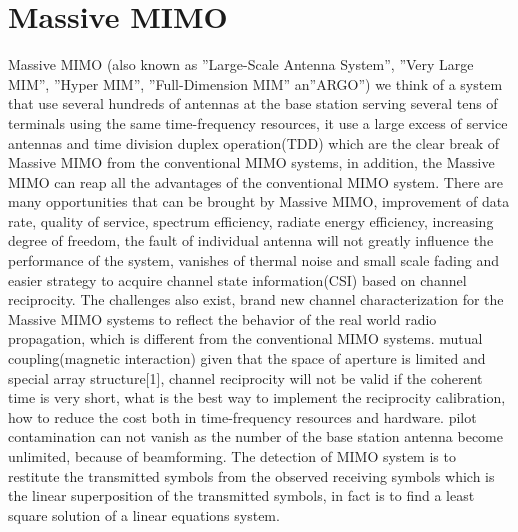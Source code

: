 \documentclass[conference]{IEEEtran}
\begin{document}
\section{Massive MIMO}
Massive MIMO (also known as ''Large-Scale Antenna System'', ''Very Large MIM'', ''Hyper MIM'', ''Full-Dimension MIM'' an''ARGO'')  we think of a system that use several hundreds of antennas at the base station serving several tens of terminals using the same time-frequency resources, it use a large excess of  service antennas and time division duplex operation(TDD) which are the clear break of Massive MIMO from the conventional MIMO systems, in addition, the Massive MIMO can reap all the advantages of the conventional MIMO system\cite{11}\cite{6}.
There are many opportunities that can be brought by Massive MIMO, improvement of data rate, quality of service, spectrum efficiency\cite{6}, radiate energy efficiency\cite{6}, increasing degree of freedom, the fault of individual antenna will not greatly influence the performance of the system, vanishes of thermal noise and small scale fading\cite{6} and easier strategy to acquire channel state information(CSI) based on channel reciprocity.\newline
The challenges also exist, brand new channel characterization for the Massive MIMO systems to reflect the behavior of the real world radio propagation, which is different from the conventional MIMO systems. mutual coupling(magnetic interaction) given  that the space of aperture is limited and special array structure[1], channel reciprocity will not be valid if the coherent time is very short, what is the best way to implement the reciprocity calibration, how to reduce the cost both in time-frequency resources and hardware. pilot contamination can not vanish as the number of the base station antenna become unlimited, because of beamforming. 
The detection of MIMO system is to restitute the transmitted symbols from the observed receiving symbols which is the linear superposition of the transmitted symbols, in fact is to find a least square solution of a linear equations system.
\end{document}
